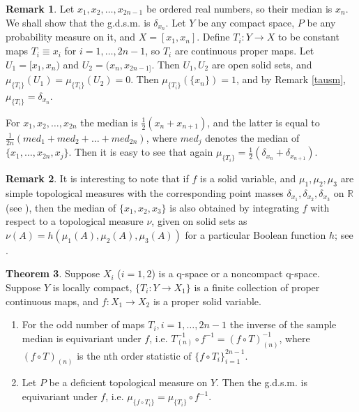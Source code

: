 \documentclass[sn-mathphys-num]{sn-jnl}%
\theoremstyle{thmstyleone}%
\theoremstyle{definition}
\newtheorem{theorem}{Theorem}%
\newtheorem{remark}[theorem]{Remark}
\begin{document}
\begin{remark}
Let $ x_1, x_2, \ldots, x_{2n-1}$ be ordered real numbers, so their median is $x_n$. We shall show that  the g.d.s.m.  is $\delta_{x_n}$.
Let $Y$ be any compact space, $P$ be any probability measure on it, and $X = [x_1, x_n]$. Define $T_i: Y \longrightarrow X$ to be constant maps
$T_i \equiv x_i$ for $i=1, \ldots, 2n-1$, so $T_i$ are continuous proper maps. Let $U_1 = [x_1, x_n)$ and $U_2 =(x_n, x_{2n-1]}$. Then 
$U_1, U_2$ are open solid sets, and $\mu_{\{ T_i \} }(U_1) = \mu_{\{ T_i \} }(U_2) = 0$. Then $\mu_{\{ T_i \} }(\{x_n\}) = 1$, 
and by Remark \ref{tausm},  $ \mu_{\{ T_i \} } = \delta_{x_n}$.

For $x_1, x_2, \ldots, x_{2n}$ the median is $\frac12( x_n + x_{n+1})$, 
and the latter is equal to $\frac{1}{2n}(med_1 + med_2 + \ldots  + med_{2n})$, where
$ med_j$ denotes the median of $\{x_1, \ldots, x_{2n}, x_j \}$. Then it is easy to see that again $\mu_{\{ T_i \} } = \frac12  (\delta_{x_n} + \delta_{x_{n+1}})$.
\end{remark}

\begin{remark}
It is interesting to note that if $f$ is a solid variable,  and $\mu_1, \mu_2, \mu_3$ are simple topological measures with the corresponding point masses
$\delta_{x_1}, \delta_{x_2}, \delta_{x_3} $ on $\mathbb{R}$ (see \cite[L. 6.11]{Butler:ReprDTM}),
then the median of $\{ x_1, x_2, x_3\}$ is also obtained by integrating $f$ 
with respect to a topological measure $\nu$, given on solid sets as $ \nu(A) = h(\mu_1(A), \mu_2(A), \mu_3(A))$ for a particular Boolean function $h$;
see \cite[L. 38]{OrjanAlf:Boolean}.
\end{remark}

\begin{theorem} \label{equivar}
Suppose $X_i$ ($i=1,2$) is a q-space or a noncompact q-space.
Suppose $Y$ is locally compact,  $\{ T_i: Y \longrightarrow X_1 \}$ is a finite collection of proper continuous maps, 
and $f: X_1  \longrightarrow X_2$ is a proper solid variable.   
\begin{enumerate}[label=(\roman*),ref=(\roman*)]
\item
For the odd number of maps $T_i, i =1, \ldots, 2n-1$  the inverse of the sample median is equivariant under  $f$, i.e.
$ T_{(n)}^{-1} \circ f^{-1} = (f \circ T)_{(n)}^{-1}$, where $(f \circ T)_{(n)}$ is the nth order statistic of $ \{f \circ T_i\}_{i=1}^{2n-1}$.
\item
Let $P$ be a deficient topological measure on $Y$. 
Then the g.d.s.m. is equivariant under  $f$, i.e. $\mu_{\{f \circ T_i \} } = \mu_{ \{T_i \} }  \circ f^{-1}$.  
\end{enumerate}
\end{theorem}
\end{document}
